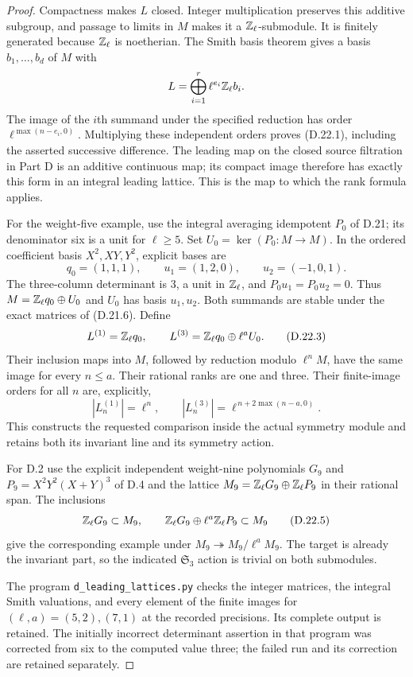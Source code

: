 \begin{proof}
Compactness makes $L$ closed. Integer multiplication preserves
this additive subgroup, and passage to limits in $M$ makes
it a $\mathbb Z_\ell$-submodule. It is finitely generated because
$\mathbb Z_\ell$ is noetherian. The Smith basis theorem gives a
basis $b_1,\ldots,b_d$ of $M$ with
\[
                 L=\bigoplus_{i=1}^r
                         \ell^{e_i}\mathbb Z_\ell b_i.
\]
The image of the $i$th summand under the specified reduction
has order $\ell^{\max(n-e_i,0)}$. Multiplying these independent
orders proves (D.22.1), including the asserted successive
difference. The leading map on the closed source filtration
in Part D is an additive continuous map; its compact image
therefore has exactly this form in an integral leading
lattice. This is the map to which the rank formula applies.

For the weight-five example, use the integral averaging
idempotent $P_0$ of D.21; its denominator six is a unit for
$\ell\geq5$. Set $U_0=\ker(P_0:M\to M)$. In the ordered
coefficient basis $X^2,XY,Y^2$, explicit bases are
\[
 q_0=(1,1,1),\qquad u_1=(1,2,0),\qquad u_2=(-1,0,1).
 \tag{D.22.2}
\]
The three-column determinant is $3$, a unit in $\mathbb Z_\ell$,
and $P_0u_1=P_0u_2=0$. Thus
$M=\mathbb Z_\ell q_0\oplus U_0$ and $U_0$ has basis $u_1,u_2$.
Both summands are stable under the exact matrices of
(D.21.6). Define
\[
 L^{(1)}=\mathbb Z_\ell q_0,\qquad
 L^{(3)}=\mathbb Z_\ell q_0\oplus\ell^a U_0.
 \tag{D.22.3}
\]
Their inclusion maps into $M$, followed by reduction modulo
$\ell^nM$, have the same image for every $n\leq a$.
Their rational ranks are one and three. Their finite-image
orders for all $n$ are, explicitly,
\[
 |L^{(1)}_n|=\ell^n,\qquad
 |L^{(3)}_n|=\ell^{\,n+2\max(n-a,0)}.
 \tag{D.22.4}
\]
This constructs the requested comparison inside the actual
symmetry module and retains both its invariant line and its
symmetry action.

For D.2 use the explicit independent weight-nine
polynomials $G_9$ and $P_9=X^2Y^2(X+Y)^3$ of D.4 and
the lattice $M_9=\mathbb Z_\ell G_9\oplus\mathbb Z_\ell P_9$ in
their rational span. The inclusions
\[
 \mathbb Z_\ell G_9\subset M_9,
 \qquad \mathbb Z_\ell G_9\oplus\ell^a\mathbb Z_\ell P_9\subset M_9
 \tag{D.22.5}
\]
give the corresponding example under
$M_9\twoheadrightarrow M_9/\ell^aM_9$.
The target is already the invariant part, so the indicated
$\mathfrak S_3$ action is trivial on both submodules.

The program \texttt{d\_leading\_lattices.py} checks the
integer matrices, the integral Smith valuations, and every
element of the finite images for $(\ell,a)=(5,2),(7,1)$
at the recorded precisions. Its complete output is retained.
The initially incorrect determinant assertion in that program
was corrected from six to the computed value three; the
failed run and its correction are retained separately.


\end{proof}
